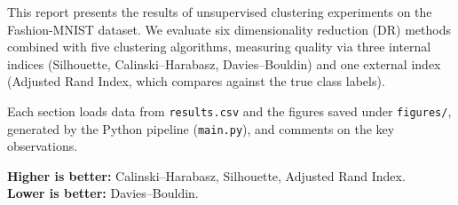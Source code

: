 This report presents the results of unsupervised clustering experiments on the Fashion-MNIST
dataset. We evaluate six dimensionality reduction (DR) methods combined with five clustering
algorithms, measuring quality via three internal indices (Silhouette, Calinski--Harabasz,
Davies--Bouldin) and one external index (Adjusted Rand Index, which compares against the
true class labels).

Each section loads data from \texttt{results.csv} and the figures saved under \texttt{figures/},
generated by the Python pipeline (\texttt{main.py}), and comments on the key observations.

\medskip
\noindent\textbf{Higher is better:} Calinski--Harabasz, Silhouette, Adjusted Rand Index.\\
\textbf{Lower is better:} Davies--Bouldin.
